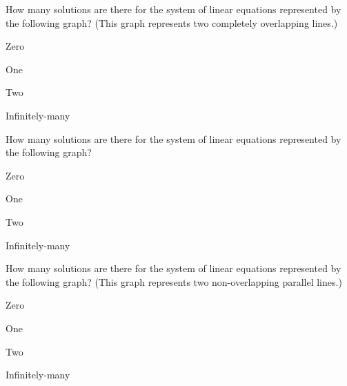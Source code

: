 \begin{readinessAssuranceTest}
\item How many solutions are there for the system of linear equations
      represented by the following graph? (This graph represents two completely
      overlapping lines.)
    \begin{center}
      \systemWithInfinitelyManySolutions
    \end{center}

\begin{multicols}{4}
\begin{readinessAssuranceTestChoices}
\item Zero
\item One
\item Two
\item Infinitely-many %
\end{readinessAssuranceTestChoices}
\end{multicols}


\item How many solutions are there for the system of linear equations
      represented by the following graph?
    \begin{center}
      \systemWithOneSolutionA
    \end{center}

\begin{multicols}{4}
\begin{readinessAssuranceTestChoices}
\item Zero
\item One %
\item Two
\item Infinitely-many
\end{readinessAssuranceTestChoices}
\end{multicols}


\item How many solutions are there for the system of linear equations
      represented by the following graph? (This graph represents two
      non-overlapping parallel lines.)
    \begin{center}
      \systemWithNoSolutions
    \end{center}

\begin{multicols}{4}
\begin{readinessAssuranceTestChoices}
\item Zero %
\item One
\item Two
\item Infinitely-many
\end{readinessAssuranceTestChoices}
\end{multicols}


\end{readinessAssuranceTest}
